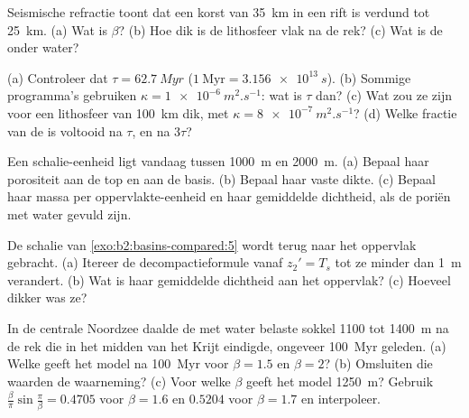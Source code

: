 \begin{exercise}[$\star$]\label{exo:b2:basins-compared:3}
Seismische refractie toont dat een korst van \qty{35}{km} in een rift is verdund tot \qty{25}{km}.
(a) Wat is $\beta$? (b) Hoe dik is de lithosfeer vlak na de rek? (c) Wat is de
 onder water?
\end{exercise}

\begin{exercise}[$\star$]\label{exo:b2:basins-compared:4}
(a) Controleer dat $\tau = \qty{62.7}{Myr}$ ($1~\text{Myr} = \qty{3.156e13}{s}$). (b) Sommige programma's
gebruiken $\kappa = \qty{1e-6}{m^2.s^{-1}}$: wat is $\tau$ dan? (c) Wat zou ze zijn voor een
lithosfeer van \qty{100}{km} dik, met $\kappa = \qty{8e-7}{m^2.s^{-1}}$? (d) Welke fractie van
de  is voltooid na $\tau$, en na $3\tau$?
\end{exercise}

\begin{exercise}[$\star\star$]\label{exo:b2:basins-compared:5}
Een schalie-eenheid ligt vandaag tussen \qty{1000}{m} en \qty{2000}{m}. (a) Bepaal haar porositeit aan de
top en aan de basis. (b) Bepaal haar vaste dikte. (c) Bepaal haar massa per oppervlakte-eenheid en haar gemiddelde
dichtheid, als de poriën met water gevuld zijn.
\end{exercise}

\begin{exercise}[$\star\star$]\label{exo:b2:basins-compared:6}
De schalie van \cref{exo:b2:basins-compared:5} wordt terug naar het oppervlak gebracht. (a) Itereer de
decompactieformule vanaf $z_2' = T_s$ tot ze minder dan \qty{1}{m} verandert. (b) Wat is
haar gemiddelde dichtheid aan het oppervlak? (c) Hoeveel dikker was ze?
\end{exercise}

\begin{exercise}[$\star\star$]\label{exo:b2:basins-compared:7}
In de centrale Noordzee daalde de met water belaste sokkel 1100 tot \qty{1400}{m} na de
rek die in het midden van het Krijt eindigde, ongeveer \qty{100}{Myr} geleden. (a) Welke
 geeft het model na \qty{100}{Myr} voor $\beta = 1.5$ en $\beta = 2$? (b) Omsluiten
die waarden de waarneming? (c) Voor welke $\beta$ geeft het model \qty{1250}{m}?
Gebruik $\frac{\beta}{\pi}\sin\frac{\pi}{\beta} = 0.4705$ voor $\beta = 1.6$ en $0.5204$ voor $\beta
= 1.7$ en interpoleer.
\end{exercise}

